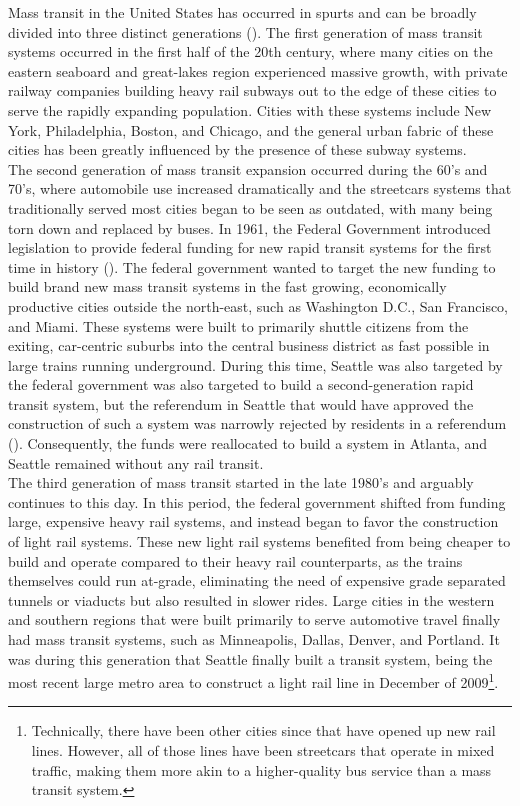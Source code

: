 \documentclass{article}
\begin{document}
Mass transit in the United States has occurred in spurts and can be broadly divided into three distinct generations (\cite{skinner_second_1980}). The first generation of mass transit systems occurred in the first half of the 20th century, where many cities on the eastern seaboard and great-lakes region experienced massive growth, with private railway companies building heavy rail subways out to the edge of these cities to serve the rapidly expanding population. Cities with these systems include New York, Philadelphia, Boston, and Chicago, and the general urban fabric of these cities has been greatly influenced by the presence of these subway systems.\\

The second generation of mass transit expansion occurred during the 60's and 70's, where automobile use increased dramatically and the streetcars systems that traditionally served most cities began to be seen as outdated, with many being torn down and replaced by buses. In 1961, the Federal Government introduced legislation to provide federal funding for new rapid transit systems for the first time in history (\cite{federal_transit_administration_brief_2020}). The federal government wanted to target the new funding to build brand new mass transit systems in the fast growing, economically productive cities outside the north-east, such as Washington D.C., San Francisco, and Miami. These systems were built to primarily shuttle citizens from the exiting, car-centric suburbs into the central business district as fast possible in large trains running underground. During this time, Seattle was also targeted by the federal government was also targeted to build a second-generation rapid transit system, but the referendum in Seattle that would have approved the construction of such a system was narrowly rejected by residents in a referendum (\cite{cohen_how_2016}). Consequently, the funds were reallocated to build a system in Atlanta, and Seattle remained without any rail transit. \\

The third generation of mass transit started in the late 1980's and arguably continues to this day. In this period, the federal government shifted from funding large, expensive heavy rail systems, and instead began to favor the construction of light rail systems. These new light rail systems benefited from being cheaper to build and operate compared to their heavy rail counterparts, as the trains themselves could run at-grade, eliminating the need of expensive grade separated tunnels or viaducts but also resulted in slower rides. Large cities in the western and southern regions that were built primarily to serve automotive travel finally had mass transit systems, such as Minneapolis, Dallas, Denver, and Portland. It was during this generation that Seattle finally built a transit system, being the most recent large metro area to construct a light rail line in December of 2009\footnote{Technically, there have been other cities since that have opened up new rail lines. However, all of those lines have been streetcars that operate in mixed traffic, making them more akin to a higher-quality bus service than a mass transit system.}. \\
\end{document}
